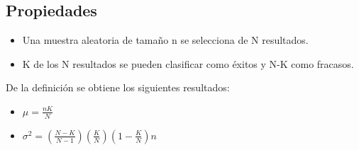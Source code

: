\subsection{Propiedades}
\begin{itemize}
    \item Una muestra aleatoria de tamaño n se selecciona de N resultados.
    \item K de los N resultados se pueden clasificar como éxitos y N-K como fracasos.
\end{itemize}
De la definición se obtiene los siguientes resultados:
\begin{itemize}
    \item $\mu=\frac{nK}{N}$
    \item $\sigma^2= \left(\frac{N-K}{N-1}\right)\left(\frac{K}{N}\right)\left(1-\frac{K}{N}\right)n$
\end{itemize}
